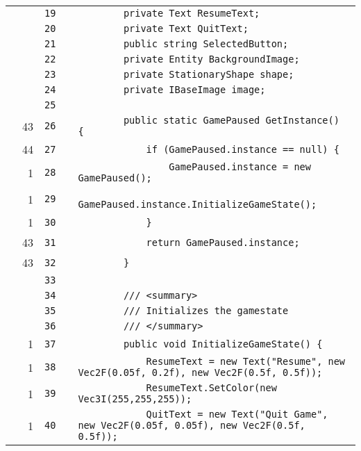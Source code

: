 \documentclass[a4paper,landscape,10pt]{article}
\begin{document}
\begin{longtable}[l]{lrrll}
\cellcolor{gray} &  & \verb~19~ & & \verb~        private Text ResumeText;~\\
\cellcolor{gray} &  & \verb~20~ & & \verb~        private Text QuitText;~\\
\cellcolor{gray} &  & \verb~21~ & & \verb~        public string SelectedButton;~\\
\cellcolor{gray} &  & \verb~22~ & & \verb~        private Entity BackgroundImage;~\\
\cellcolor{gray} &  & \verb~23~ & & \verb~        private StationaryShape shape;~\\
\cellcolor{gray} &  & \verb~24~ & & \verb~        private IBaseImage image;~\\
\cellcolor{gray} &  & \verb~25~ & & \verb~~\\
\cellcolor{green} & 43 & \verb~26~ & & \verb~        public static GamePaused GetInstance() {~\\
\cellcolor{green} & 44 & \verb~27~ & & \verb~            if (GamePaused.instance == null) {~\\
\cellcolor{green} & 1 & \verb~28~ & & \verb~                GamePaused.instance = new GamePaused();~\\
\cellcolor{green} & 1 & \verb~29~ & & \verb~                GamePaused.instance.InitializeGameState();~\\
\cellcolor{green} & 1 & \verb~30~ & & \verb~            }~\\
\cellcolor{green} & 43 & \verb~31~ & & \verb~            return GamePaused.instance;~\\
\cellcolor{green} & 43 & \verb~32~ & & \verb~        }~\\
\cellcolor{gray} &  & \verb~33~ & & \verb~~\\
\cellcolor{gray} &  & \verb~34~ & & \verb~        /// <summary>~\\
\cellcolor{gray} &  & \verb~35~ & & \verb~        /// Initializes the gamestate~\\
\cellcolor{gray} &  & \verb~36~ & & \verb~        /// </summary>~\\
\cellcolor{green} & 1 & \verb~37~ & & \verb~        public void InitializeGameState() {~\\
\cellcolor{green} & 1 & \verb~38~ & & \verb~            ResumeText = new Text("Resume", new Vec2F(0.05f, 0.2f), new Vec2F(0.5f, 0.5f));~\\
\cellcolor{green} & 1 & \verb~39~ & & \verb~            ResumeText.SetColor(new Vec3I(255,255,255));~\\
\cellcolor{green} & 1 & \verb~40~ & & \verb~            QuitText = new Text("Quit Game", new Vec2F(0.05f, 0.05f), new Vec2F(0.5f,  0.5f));~\\

\end{longtable}
\end{document}
